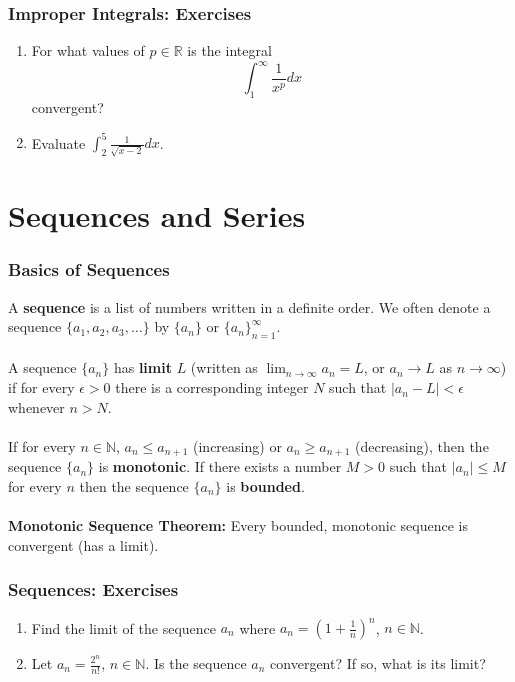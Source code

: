 \documentclass{beamer}
\begin{document}
\begin{frame}
\frametitle{Improper Integrals: Exercises}
\begin{enumerate}
\item For what values of $p \in \mathbb{R}$ is the integral
$$
\int_1^{\infty} \frac{1}{x^p} dx
$$
convergent?
\vspace*{1in}
\item Evaluate $\int_2^5 \frac{1}{\sqrt{x-2}} dx$.
\vspace*{1.2in}
\end{enumerate}
\end{frame}


\section{Sequences and Series}
\begin{frame}
\frametitle{Basics of Sequences}
A \textbf{sequence }is a list of numbers written in a definite order. We often denote a sequence $\{a_1,a_2,a_3,\ldots\}$ by $\{a_n\}$ or $\{a_n\}_{n=1}^{\infty}$.
\\~\\
A sequence $\{a_n\}$ has \textbf{limit} $L$ (written as $\lim_{n \rightarrow \infty} a_n = L$, or $a_n \rightarrow L$ as $n\rightarrow \infty$) if for every $\epsilon > 0$ there is a corresponding integer $N$ such that $\vert a_n - L \vert < \epsilon$ whenever $n > N$.
\\~\\
If for every $n \in \mathbb{N}$, $a_n \leq a_{n+1}$ (increasing) or $a_n \geq a_{n+1}$ (decreasing), then the sequence $\{a_n\}$ is \textbf{monotonic}. If there exists a number $M > 0$ such that $\vert a_n \vert \leq M$ for every $n$ then the sequence $\{a_n\}$ is \textbf{bounded}.
\\~\\
\textbf{Monotonic Sequence Theorem:} Every bounded, monotonic sequence is convergent (has a limit).
\end{frame}

\begin{frame}
\frametitle{Sequences: Exercises}
\begin{enumerate}
\item Find the limit of the sequence ${a_n}$ where $a_n = \left(1+\frac{1}{n}\right)^n$, $n \in \mathbb{N}$.
\vspace*{1.2in}
\item Let $a_n = \frac{2^n}{n!}$, $n \in \mathbb{N}$. Is the sequence ${a_n}$ convergent? If so, what is its limit?
\vspace*{1.2in}
\end{enumerate}
\end{frame}
\end{document}
